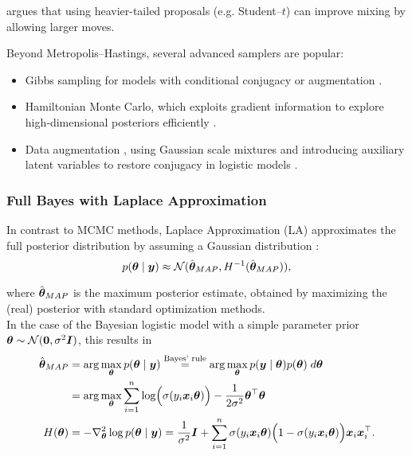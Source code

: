 \citep{scott_data_2011} argues that using heavier-tailed proposals (e.g. Student–$t$) can improve mixing by allowing larger moves.\\

Beyond Metropolis–Hastings, several advanced samplers are popular:

\begin{itemize}
    \item Gibbs sampling for models with conditional conjugacy or augmentation \citep{dellaportas_bayesian_1993}.
    \item Hamiltonian Monte Carlo, which exploits gradient information to explore high‐dimensional posteriors efficiently \citep{neal_probabilistic_1993}.
    \item Data augmentation \citep{albert_bayesian_1993}, using Gaussian scale mixtures and introducing auxiliary latent variables to restore conjugacy in logistic models \citep{holmes_efficient_nodate,fruhwirth-schnatter_auxiliary_2007,scott_data_2011}.
\end{itemize}

\subsubsection*{Full Bayes with Laplace Approximation}

In contrast to MCMC methods, Laplace Approximation (LA) approximates the full posterior distribution by assuming a Gaussian distribution \citep{tierney_accurate_1986}:
\begin{equation*}
    p(\bm{\theta} \mid \bm{y}) \approx \mathcal{N}(\hat{\bm{\theta}}_{MAP}, H^{-1}(\hat{\bm{\theta}}_{MAP})),
\end{equation*}

where $\hat{\bm{\theta}}_{MAP}$ is the maximum posterior estimate, obtained by maximizing the (real) posterior with standard optimization methods.\\

In the case of the Bayesian logistic model with a simple parameter prior $\bm{\theta} \sim \mathcal{N}(\bm{0}, \sigma^2 \bm{I})$, this results in
\begin{equation*}
    \begin{aligned}
        \hat{\bm{\theta}}_{MAP} &= \arg \max_{\bm{\theta}} p(\bm{\theta} \mid \bm{y})
            \overset{\text{Bayes' rule}}{=} \arg \max_{\bm{\theta}} p(\bm{y} \mid \bm{\theta}) p(\bm{\theta}) \; d\bm{\theta}  \\
            &= \arg \max_{\bm{\theta}} \sum_{i = 1}^n \log \Bigl( \sigma(y_i \bm{x}_i\bm{\theta})\Bigr) - \frac{1}{2 \sigma^2} \bm{\theta}^\top \bm{\theta} \\
        H(\bm{\theta}) &= - \nabla^2_{\bm{\theta}}  \log p (\bm{\theta} \mid \bm{y}) = \frac{1}{\sigma^2} \bm{I} + \sum_{i = 1}^n
        \sigma(y_i \bm{x}_i\bm{\theta}) \Bigl(1 - \sigma(y_i \bm{x}_i\bm{\theta})\Bigr)
            \bm{x}_i \bm{x}_i^\top.
    \end{aligned}
\end{equation*}

